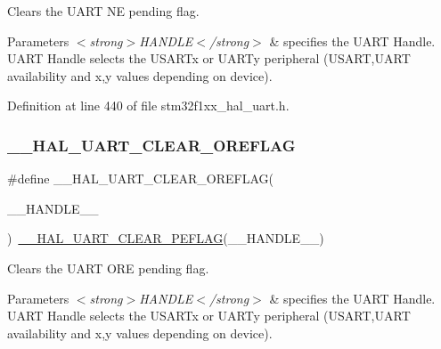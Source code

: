 Clears the U\+A\+RT NE pending flag. 


\begin{DoxyParams}{Parameters}
{\em $<$strong$>$\+H\+A\+N\+D\+L\+E$<$/strong$>$} & specifies the U\+A\+RT Handle. U\+A\+RT Handle selects the U\+S\+A\+R\+Tx or U\+A\+R\+Ty peripheral (U\+S\+A\+RT,U\+A\+RT availability and x,y values depending on device). \\
\hline
\end{DoxyParams}


Definition at line 440 of file stm32f1xx\+\_\+hal\+\_\+uart.\+h.

\mbox{\label{group___u_a_r_t___exported___macros_ga9cdc2f2d55eaaa7895996bf6848df42e}} 
\subsubsection{\texorpdfstring{\+\_\+\+\_\+\+H\+A\+L\+\_\+\+U\+A\+R\+T\+\_\+\+C\+L\+E\+A\+R\+\_\+\+O\+R\+E\+F\+L\+AG}{\_\_HAL\_UART\_CLEAR\_OREFLAG}}
{\footnotesize\ttfamily \#define \+\_\+\+\_\+\+H\+A\+L\+\_\+\+U\+A\+R\+T\+\_\+\+C\+L\+E\+A\+R\+\_\+\+O\+R\+E\+F\+L\+AG(\begin{DoxyParamCaption}\item[{}]{\+\_\+\+\_\+\+H\+A\+N\+D\+L\+E\+\_\+\+\_\+ }\end{DoxyParamCaption})~\hyperlink{group___u_a_r_t___exported___macros_gaba5e19c60e0f37341b1585a380b84d49}{\+\_\+\+\_\+\+H\+A\+L\+\_\+\+U\+A\+R\+T\+\_\+\+C\+L\+E\+A\+R\+\_\+\+P\+E\+F\+L\+AG}(\+\_\+\+\_\+\+H\+A\+N\+D\+L\+E\+\_\+\+\_\+)}



Clears the U\+A\+RT O\+RE pending flag. 


\begin{DoxyParams}{Parameters}
{\em $<$strong$>$\+H\+A\+N\+D\+L\+E$<$/strong$>$} & specifies the U\+A\+RT Handle. U\+A\+RT Handle selects the U\+S\+A\+R\+Tx or U\+A\+R\+Ty peripheral (U\+S\+A\+RT,U\+A\+RT availability and x,y values depending on device). \\
\hline
\end{DoxyParams}


